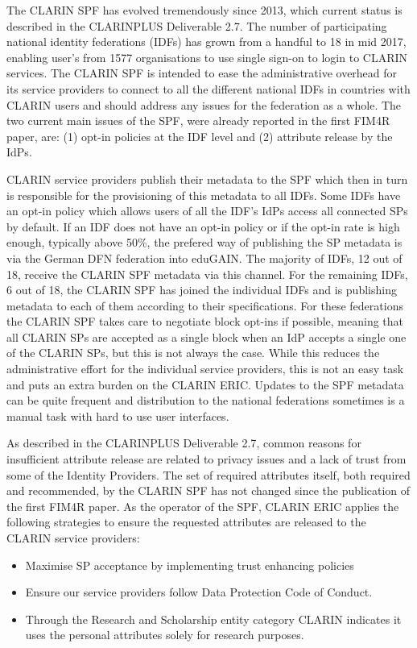 \documentclass[fleqn,11pt]{wlscirep}
\begin{document}
{The CLARIN SPF has evolved tremendously since 2013, which current status is described in the CLARINPLUS Deliverable 2.7. The number of participating national identity federations (IDFs) has grown from a handful to 18 in mid 2017, enabling user's from 1577 organisations to use single sign-on to login to CLARIN services. The CLARIN SPF is intended to ease the administrative overhead for its service providers to connect to all the different national IDFs in countries with CLARIN users and should address  any issues for the federation as a whole. The two current main issues of the SPF, were already reported in the first FIM4R paper, are: (1) opt-in policies at the IDF level and (2) attribute release by the IdPs. 

CLARIN service providers publish their metadata to the SPF which then in turn is responsible for the provisioning of this metadata to all IDFs. Some IDFs have an opt-in policy which allows users of all the IDF’s IdPs access all connected SPs by default.  If an IDF does not have an opt-in policy or if the opt-in rate is high enough, typically above 50\%, the prefered way of publishing the SP metadata is via the German DFN federation into eduGAIN. The majority of IDFs, 12 out of 18, receive the CLARIN SPF metadata via this channel. For the remaining IDFs, 6 out of 18, the CLARIN SPF has joined the individual IDFs and is publishing metadata to each of them according to their specifications. For these federations the CLARIN SPF takes care to negotiate block opt-ins if possible, meaning that all CLARIN SPs are accepted as a single block when an IdP accepts a single one of the CLARIN SPs, but this is not always the case. While this reduces the administrative effort  for the individual service providers, this is not an easy task and puts an extra  burden on the CLARIN ERIC. Updates to the SPF metadata can be quite frequent and distribution to the national federations sometimes is a manual task with hard to use user interfaces.

As described in the CLARINPLUS Deliverable 2.7\cite{vanuyt}, common reasons for insufficient attribute release are related to privacy issues and a lack of trust from some of the Identity Providers. The set of required attributes itself, both required and recommended, by the CLARIN SPF has not changed since the publication of the  first FIM4R paper. As the operator of the SPF, CLARIN ERIC applies the following strategies to ensure the requested attributes are released to the CLARIN  service providers:
\begin{itemize}
\item Maximise SP acceptance by implementing trust enhancing policies
\item Ensure our service providers follow Data Protection Code of Conduct.
\item Through the Research and Scholarship entity category CLARIN indicates it uses the personal attributes solely for research purposes.
\end{itemize}

}
\end{document}
